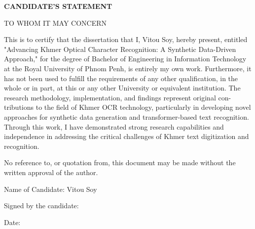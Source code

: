 \begin{adjustwidth}{0.2cm}{0.2cm}

\begin{center}
    {\englishfont\fontsize{14pt}{21pt}\selectfont \textbf{CANDIDATE'S STATEMENT} \par}
\end{center}
\label{candidate-statement}

\vspace{1cm}
{\englishfont\fontsize{12pt}{18pt}\selectfont \setlength{\parindent}{0pt} TO WHOM IT MAY CONCERN \par}

\vspace{0.5cm}
    \setlength{\parindent}{0pt}
    {\large This is to certify that the dissertation that I, Vitou Soy, hereby present, entitled "Advancing
    Khmer Optical Character Recognition: A Synthetic Data-Driven Approach," for the degree
    of Bachelor of Engineering in Information Technology at the Royal University of Phnom Penh, is
    entirely my own work. Furthermore, it has not been used to fulfill the requirements of any
    other qualification, in the whole or in part, at this or any other University or equivalent
    institution. The research methodology, implementation, and findings represent original con-
    tributions to the field of Khmer OCR technology, particularly in developing novel approaches
    for synthetic data generation and transformer-based text recognition. Through this work, I
    have demonstrated strong research capabilities and independence in addressing the critical
    challenges of Khmer text digitization and recognition.\par}

    \vspace{0.5cm}
    \setlength{\parindent}{0pt}
    {\large No reference to, or quotation from, this document may be made without the written
    approval of the author.\par}
    \vspace{1cm}
    \setlength{\parindent}{0pt}
    {\large Name of Candidate: Vitou Soy\par}
    
    \vspace{0.5cm}
    \setlength{\parindent}{0pt}
    {\large Signed by the candidate: \dotfill\par}
    
    \vspace{0.5cm}
    \setlength{\parindent}{0pt}
    {\large Date: \dotfill\par}


\end{adjustwidth}
